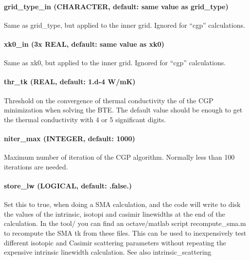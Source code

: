 \documentclass[
]{article}
\begin{document}
\hypertarget{grid_type_in-character-default-same-value-as-grid_type}{%
\paragraph{grid\_type\_in (CHARACTER, default: same value as
grid\_type)}\label{grid_type_in-character-default-same-value-as-grid_type}}

Same as grid\_type, but applied to the inner grid. Ignored for
\enquote{cgp} calculations.

\hypertarget{xk0_in-3x-real-default-same-value-as-xk0}{%
\paragraph{xk0\_in (3x REAL, default: same value as
xk0)}\label{xk0_in-3x-real-default-same-value-as-xk0}}

Same as xk0, but applied to the inner grid. Ignored for \enquote{cgp}
calculations.

\hypertarget{thr_tk-real-default-1.d-4-wmk}{%
\paragraph{thr\_tk (REAL, default: 1.d-4
W/mK)}\label{thr_tk-real-default-1.d-4-wmk}}

Threshold on the convergence of thermal conductivity the of the CGP
minimization when solving the BTE. The default value should be enough to
get the thermal conductivity with 4 or 5 significant digits.

\hypertarget{niter_max-integer-default-1000}{%
\paragraph{niter\_max (INTEGER, default:
1000)}\label{niter_max-integer-default-1000}}

Maximum number of iteration of the CGP algorithm. Normally less than 100
iterations are needed.

\hypertarget{store_lw-logical-default-.false.}{%
\paragraph{store\_lw (LOGICAL, default:
.false.)}\label{store_lw-logical-default-.false.}}

Set this to true, when doing a SMA calculation, and the code will write
to disk the values of the intrinsic, isotopi and casimir linewidths at
the end of the calculation. In the tool/ you can find an octave/matlab
script recompute\_sma.m to recompute the SMA tk from these files. This
can be used to inexpensively test different isotopic and Casimir
scattering parameters without repeating the expensive intrinsic
linewidth calculation. See also intrinsic\_scattering
\end{document}
